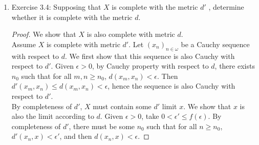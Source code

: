 \documentclass{article}
\begin{document}
\begin{enumerate}
\begin{proof}
      Finally, we can prove the statement using K\"{o}nig's Lemma. Let
      $\mathcal{C}=(\sigma_i)_{i\in\omega}\subseteq 2^{<\omega}$ define an open
      cover of the Cantor space, and assume by contradiction that no finite
      subset of set of covers the space. Let $\mathcal{T}$ be a sub-tree
      of $2^\omega$ consisting of exactly the nodes whose children are not
      covered by any finite subset of $\mathcal{C}$. This sub-tree is
      infinite because each level of $2^\omega$ must contain at least one
      node in $\mathcal{T}$ otherwise $\mathcal{C}$ would finitely cover
      the Cantor space. The sub-tree is also connected because for each
      node in $\mathcal{T}$, its parent node must also be in $\mathcal{T}$.
      Hence by K\"{o}nig's Lemma, $\mathcal{T}$ must contain an infinite
      path. From our construction of $\mathcal{T}$, this path cannot be
      covered by any cover in $\mathcal{C}$, a contradiction.
    \end{proof}

  \item Exercise 3.4: Supposing that $X$ is complete with the metric $d'$ ,
    determine whether it is complete with the metric $d$.
    \begin{proof}
      We show that $X$ is also complete with metric $d$. \\

      Assume $X$ is complete with metric $d'$. Let $(x_n)_{n\in\omega}$ be
      a Cauchy sequence with respect to $d$. We first show that this
      sequence is also Cauchy with respect to $d'$. Given $\epsilon>0$, by
      Cauchy property with respect to $d$, there exists $n_0$ such that for
      all $m,n\geq n_0$, $d(x_m,x_n)<\epsilon$. Then
      $d'(x_m,x_n)\leq d(x_m,x_n)<\epsilon$, hence the sequence is also Cauchy
      with respect to $d'$. \\

      By completeness of $d'$, $X$ must contain some $d'$ limit $x$. We
      show that $x$ is also the limit according to $d$. Given $\epsilon>0$,
      take $0<\epsilon'\leq f(\epsilon)$. By completeness of $d'$, there
      must be some $n_0$ such that for all $n\geq n_0$,
      $d'(x_n,x)<\epsilon'$, and then $d(x_n,x)<\epsilon$.
    \end{proof}
\end{enumerate}
\end{document}
